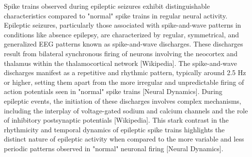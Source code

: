 \documentclass[a4paper, UKenglish, 11pt]{uiomaster}
\begin{document}
Spike trains observed during epileptic seizures exhibit distinguishable characteristics compared to "normal" spike trains in regular neural activity. Epileptic seizures, particularly those associated with spike-and-wave patterns in conditions like absence epilepsy, are characterized by regular, symmetrical, and generalized EEG patterns known as spike-and-wave discharges. These discharges result from bilateral synchronous firing of neurons involving the neocortex and thalamus within the thalamocortical network [Wikipedia]. The spike-and-wave discharges manifest as a repetitive and rhythmic pattern, typically around 2.5 Hz or higher, setting them apart from the more irregular and unpredictable firing of action potentials seen in "normal" spike trains [Neural Dynamics]. During epileptic events, the initiation of these discharges involves complex mechanisms, including the interplay of voltage-gated sodium and calcium channels and the role of inhibitory postsynaptic potentials [Wikipedia]. This stark contrast in the rhythmicity and temporal dynamics of epileptic spike trains highlights the distinct nature of epileptic activity when compared to the more variable and less periodic patterns observed in "normal" neuronal firing [Neural Dynamics].


\end{document}
